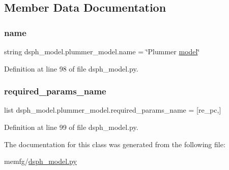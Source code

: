 \subsection{Member Data Documentation}
\mbox{\label{classdsph__model_1_1plummer__model_a16dcc9b3cd8290aa250867b0efce5e89}} 
\subsubsection{\texorpdfstring{name}{name}}
{\footnotesize\ttfamily string dsph\+\_\+model.\+plummer\+\_\+model.\+name = \char`\"{}Plummer \hyperlink{classdsph__model_1_1model}{model}\char`\"{}\hspace{0.3cm}{\ttfamily [static]}}



Definition at line 98 of file dsph\+\_\+model.\+py.

\mbox{\label{classdsph__model_1_1plummer__model_a6b8e4509e346d34d25831534486047fe}} 
\subsubsection{\texorpdfstring{required\+\_\+params\+\_\+name}{required\_params\_name}}
{\footnotesize\ttfamily list dsph\+\_\+model.\+plummer\+\_\+model.\+required\+\_\+params\+\_\+name = \mbox{[}\textquotesingle{}re\+\_\+pc\textquotesingle{},\mbox{]}\hspace{0.3cm}{\ttfamily [static]}}



Definition at line 99 of file dsph\+\_\+model.\+py.



The documentation for this class was generated from the following file\+:\begin{DoxyCompactItemize}
\item 
memfg/\hyperlink{dsph__model_8py}{dsph\+\_\+model.\+py}\end{DoxyCompactItemize}
